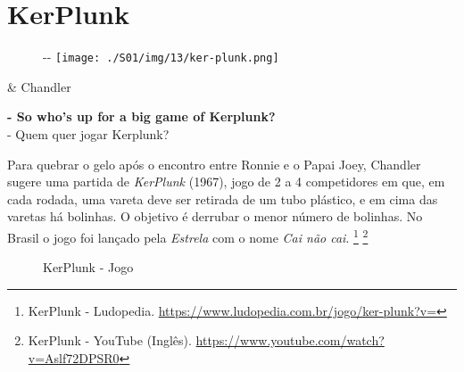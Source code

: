 \hypertarget{kerplunk}{%
\section{KerPlunk}\label{kerplunk}}

\begin{figure}[!ht]
  \begin{adjustwidth}{-\oddsidemargin-1in}{-\rightmargin}
    \centering
    \texttt{[image: ./S01/img/13/ker-plunk.png]}
  \end{adjustwidth}
\end{figure}

\begin{tcolorbox}[enhanced,center upper,
    drop fuzzy shadow southeast, boxrule=0.3pt,
    lower separated=false,
    colframe=black!30!dialogoBorder,colback=white]
\begin{minipage}[c]{0.16\linewidth}
   & \centering \scriptsize{Chandler}
\end{minipage}
\hfill
\begin{minipage}[c]{0.8\linewidth}
  \textbf{- So who's up for a big game of Kerplunk?}\\
  - Quem quer jogar Kerplunk?
\end{minipage}
\end{tcolorbox}

Para quebrar o gelo após o encontro entre Ronnie e o Papai Joey,
Chandler sugere uma partida de \emph{KerPlunk} (1967), jogo de 2 a 4
competidores em que, em cada rodada, uma vareta deve ser retirada de um
tubo plástico, e em cima das varetas há bolinhas. O objetivo é derrubar
o menor número de bolinhas. No Brasil o jogo foi lançado pela
\emph{Estrela} com o nome \emph{Cai não cai}. \footnote{\sloppy KerPlunk - Ludopedia. \url{https://www.ludopedia.com.br/jogo/ker-plunk?v=}}
\footnote{\sloppy KerPlunk - YouTube (Inglês). \url{https://www.youtube.com/watch?v=Aslf72DPSR0}}

\begin{figure}
  \centering
    \caption{KerPlunk - Jogo\label{fig:ker-plunk-jogo}}
\end{figure}

